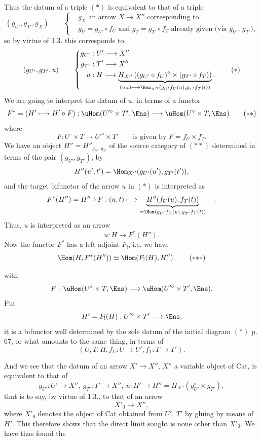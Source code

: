  Thus the datum of a triple $(*)$ is equivalent to that of a triple
\[
(g_{U'}, g_{T'}, g_X) \qquad
\left\{\begin{aligned}
&g_X \text{ an arrow } X\longrightarrow X'' \text{ corresponding to}\\
&g_U = g_{U'}\circ f_U \text{ and } g_T = g_{T'}\circ f_T \text{ already given (via } g_{U'}\text{, } g_{T'}\text{),}
\end{aligned}\right.
\]
so by virtue of 1.3. this corresponds to
\[
(g_{U'}, g_{T'}, u) \qquad
\left\{\begin{aligned}
g_{U'} &: U' \longrightarrow X''\\
g_{T'} &: T' \longrightarrow X''\\
u &: H \longrightarrow \underbrace{H_{X''}\left((g_{U'}\circ f_U)^{\circ}\times(g_{T'}\circ f_T)\right)}_{(u,t)\longmapsto \Hom_{X''}(g_{U'}f_U(u),g_{T'}f_T(t))}.
\end{aligned}\right.
\tag*{$(*)$}
\]
We are going to interpret the datum of $u$, in terms of a functor
\[
F^{*} = (H'\longmapsto H'\circ F) : \uHom(U'^{\circ}\times T',\Ens) \longrightarrow \uHom(U^{\circ}\times T,\Ens)
\tag*{$(**)$}
\]
where
\[
F : U^{\circ}\times T \longrightarrow U'^{\circ}\times T' \qquad \text{is given by } F = f_U^{\circ}\times f_T.
\]
We have an object $H''=H''_{g_{U'},g_{T'}}$ of the source category of $(**)$ determined in terms of the pair $(g_{U'},g_{T'})$, by
\[
H''(u',t') = \Hom_{X''}(g_{U'}(u'),g_{T'}(t')),
\]
and the target bifunctor of the arrow $u$ in $(*)$ is interpreted as
\[
F^{*}(H'') = H''\circ F : (u,t)\longmapsto \underbrace{H''(f_U(u),f_T(t))}_{=\Hom(g_{U'}f_U(u),g_{T'}f_T(t))} \quad .
\]
Thus, $u$ is interpreted as an arrow
\[
u : H \longrightarrow F^{*}(H'').
\]
Now the functor $F^{*}$ has a left adjoint $F_{!}$, i.e. we have
\[
\Hom(H,F^{*}(H'')) \simeq \Hom(F_{!}(H),H'').
\tag*{$(*{*}*)$}
\]

 with
\[
F_{!} : \uHom(U^{\circ}\times T,\Ens) \longrightarrow \uHom(U'^{\circ}\times T',\Ens).
\]
Put
\[
H' = F_{!}(H) : U'^{\circ}\times T' \longrightarrow \Ens,
\]
it is a bifunctor well determined by the sole datum of the initial diagram $(*)$ p. 67, or what amounts to the same thing, in terms of %
\[
(U,T,H,f_U : U\longrightarrow U', f_T : T\longrightarrow T').
\]

And we see that the datum of an arrow $X'\longrightarrow X''$, $X''$ a variable object of Cat, is equivalent to that of
\[
g_{U'} : U'\longrightarrow X'',\ g_{T'} : T'\longrightarrow X'',\ u : H'\longrightarrow H'' = H_{X''}(g_{U'}^{\circ}\times g_{T'}),
\]
that is to say, by virtue of 1.3., to that of an arrow
\[
X'_0 \longrightarrow X'',
\]
where $X'_0$ denotes the object of Cat obtained from $U'$, $T'$ by gluing by means of $H'$. This therefore shows that the direct limit sought is none other than $X'_0$. We have thus found the

